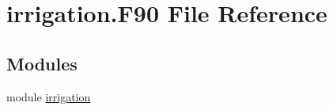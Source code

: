 \hypertarget{irrigation_8_f90}{
\section{irrigation.F90 File Reference}
\label{irrigation_8_f90}
}
\subsection*{Modules}
\begin{DoxyCompactItemize}
\item 
module \hyperlink{namespaceirrigation}{irrigation}
\end{DoxyCompactItemize}
